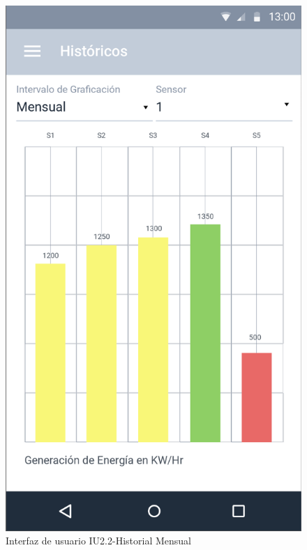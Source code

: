 \begin{figure}[H]
	\centering
	\includegraphics[scale=0.70]{Capitulo4/software/submodulos/images/mensual.png}
	\caption{Interfaz de usuario IU2.2-Historial Mensual}
	\label{fig:Historial Mensual}
\end{figure}

